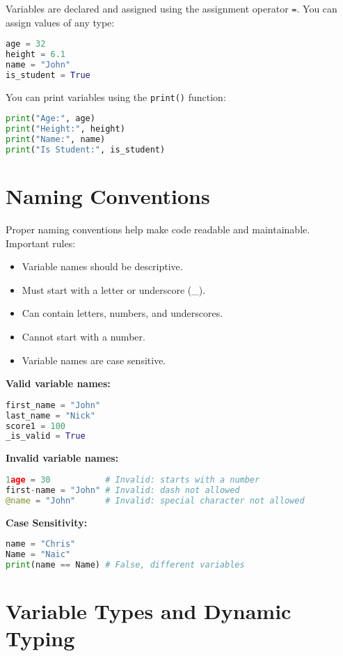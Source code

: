 Variables are declared and assigned using the assignment operator \texttt{=}.  
You can assign values of any type:

\begin{lstlisting}[language=Python]
age = 32
height = 6.1
name = "John"
is_student = True
\end{lstlisting}

You can print variables using the \texttt{print()} function:

\begin{lstlisting}[language=Python]
print("Age:", age)
print("Height:", height)
print("Name:", name)
print("Is Student:", is_student)
\end{lstlisting}

\section{Naming Conventions}

Proper naming conventions help make code readable and maintainable.  
Important rules:
\begin{itemize}
    \item Variable names should be descriptive.
    \item Must start with a letter or underscore (\_).
    \item Can contain letters, numbers, and underscores.
    \item Cannot start with a number.
    \item Variable names are case sensitive.
\end{itemize}

\textbf{Valid variable names:}
\begin{lstlisting}[language=Python]
first_name = "John"
last_name = "Nick"
score1 = 100
_is_valid = True
\end{lstlisting}

\textbf{Invalid variable names:}
\begin{lstlisting}[language=Python]
1age = 30           # Invalid: starts with a number
first-name = "John" # Invalid: dash not allowed
@name = "John"      # Invalid: special character not allowed
\end{lstlisting}

\textbf{Case Sensitivity:}
\begin{lstlisting}[language=Python]
name = "Chris"
Name = "Naic"
print(name == Name) # False, different variables
\end{lstlisting}

\section{Variable Types and Dynamic Typing}

